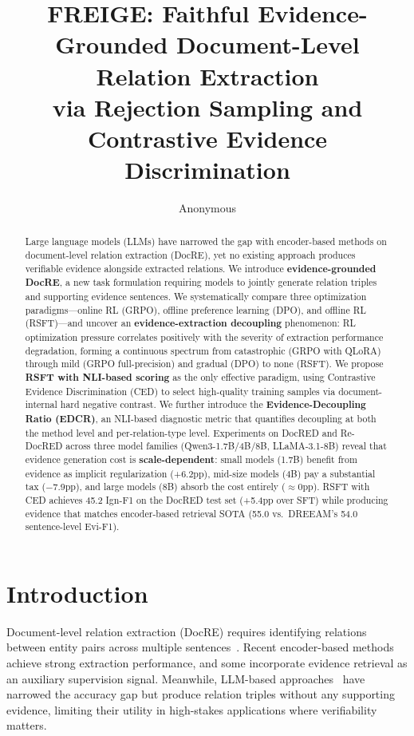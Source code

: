 \documentclass[11pt,a4paper]{article}
\title{FREIGE: Faithful Evidence-Grounded Document-Level Relation Extraction\\via Rejection Sampling and Contrastive Evidence Discrimination}
\author{Anonymous}
\begin{document}
\maketitle

\begin{abstract}
Large language models (LLMs) have narrowed the gap with encoder-based methods on document-level relation extraction (DocRE), yet no existing approach produces verifiable evidence alongside extracted relations.
We introduce \textbf{evidence-grounded DocRE}, a new task formulation requiring models to jointly generate relation triples and supporting evidence sentences.
We systematically compare three optimization paradigms---online RL (GRPO), offline preference learning (DPO), and offline RL (RSFT)---and uncover an \textbf{evidence-extraction decoupling} phenomenon: RL optimization pressure correlates positively with the severity of extraction performance degradation, forming a continuous spectrum from catastrophic (GRPO with QLoRA) through mild (GRPO full-precision) and gradual (DPO) to none (RSFT).
We propose \textbf{RSFT with NLI-based scoring} as the only effective paradigm, using Contrastive Evidence Discrimination (CED) to select high-quality training samples via document-internal hard negative contrast.
We further introduce the \textbf{Evidence-Decoupling Ratio (EDCR)}, an NLI-based diagnostic metric that quantifies decoupling at both the method level and per-relation-type level.
Experiments on DocRED and Re-DocRED across three model families (Qwen3-1.7B/4B/8B, LLaMA-3.1-8B) reveal that evidence generation cost is \textbf{scale-dependent}: small models (1.7B) benefit from evidence as implicit regularization (+6.2pp), mid-size models (4B) pay a substantial tax ($-$7.9pp), and large models (8B) absorb the cost entirely ($\approx$0pp).
RSFT with CED achieves 45.2 Ign-F1 on the DocRED test set (+5.4pp over SFT) while producing evidence that matches encoder-based retrieval SOTA (55.0 vs.\ DREEAM's 54.0 sentence-level Evi-F1).
\end{abstract}

\section{Introduction}

Document-level relation extraction (DocRE) requires identifying relations between entity pairs across multiple sentences~\cite{yao2019docred}.
Recent encoder-based methods~\cite{zhou2021atlop,tan2022dreeam,xiao2022sais} achieve strong extraction performance, and some incorporate evidence retrieval as an auxiliary supervision signal.
Meanwhile, LLM-based approaches~\cite{li2023lmrc,xu2024docks} have narrowed the accuracy gap but produce relation triples without any supporting evidence, limiting their utility in high-stakes applications where verifiability matters.
\end{document}
